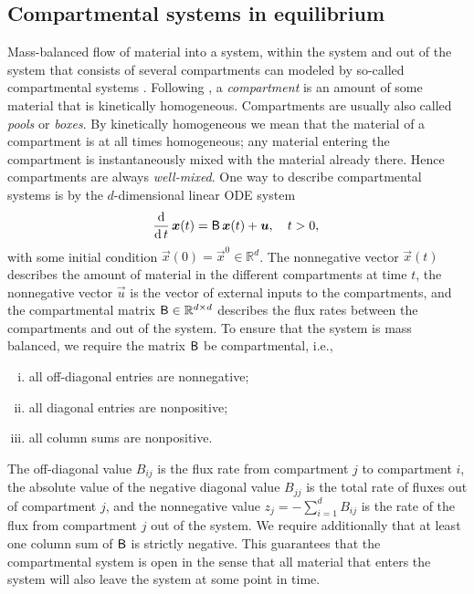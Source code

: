 \documentclass[smallextended]{svjour3}
\newcommand{\R}{\mathbb{R}}
\newcommand{\deriv}[1]{\frac{\operatorname{d}}{\operatorname{d}#1}}
\newcommand{\ie}{i.e.}
\begin{document}
\subsection{Compartmental systems in equilibrium}\label{sec:one_particle}
Mass-balanced flow of material into a system, within the system and out of the system that consists of several compartments can modeled by so-called compartmental systems \citep{Anderson1983}.
Following \citet{Jacquez1993SIAM}, a \emph{compartment} is an amount of some material that is kinetically homogeneous.
Compartments are usually also called \emph{pools} or \emph{boxes}.
By kinetically homogeneous we mean that the material of a compartment is at all times homogeneous; any material entering the compartment is instantaneously mixed with the material already there.
Hence compartments are always \emph{well-mixed}.
One way to describe compartmental systems is by the $d$-dimensional linear ODE system
\begin{equation}\label{eqn:lin_CS_sys}
  \deriv{t}\,\vec{x}(t) = \tens{B}\,\vec{x}(t) + \vec{u},\quad t>0,\\
\end{equation}
with some initial condition $\vec{x}(0) = \vec{x}^0\in\R^d$.
The nonnegative vector $\vec{x}(t)$ describes the amount of material in the different compartments at time $t$, the nonnegative vector $\vec{u}$ is the vector of external inputs to the compartments, and the compartmental matrix $\tens{B}\in\R^{d\times d}$ describes the flux rates between the compartments and out of the system.
To ensure that the system is mass balanced, we require the matrix $\mathsf{B}$ be compartmental, \ie, 
\begin{enumerate}[(i)]
    \item all off-diagonal entries are nonnegative;
    \item all diagonal entries are nonpositive;
    \item all column sums are nonpositive.
\end{enumerate}
The off-diagonal value $B_{ij}$ is the flux rate from compartment $j$ to compartment $i$, the absolute value of the negative diagonal value $B_{jj}$ is the total rate of fluxes out of compartment $j$, and the nonnegative value $z_j=-\sum_{i=1}^d B_{ij}$ is the rate of the flux from compartment $j$ out of the system.
We require additionally that at least one column sum of $\mathsf{B}$ is strictly negative.
This guarantees that the compartmental system is open in the sense that all material that enters the system will also leave the system at some point in time.
\end{document}
